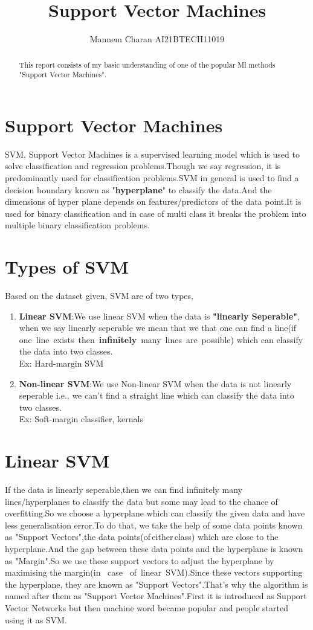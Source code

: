 \documentclass[journal,12pt,onecolumn]{IEEEtran}
\theoremstyle{remark}
\numberwithin{equation}{section}
\begin{document}
	 \title{Support Vector Machines}
	 \author{Mannem Charan AI21BTECH11019}
	 \maketitle
	   \begin{abstract}
		This report consists of my basic understanding of one of the popular Ml methods "Support Vector Machines".
	   \end{abstract}
           \section{Support Vector Machines}
	     SVM, Support Vector Machines is a supervised learning model which is used to solve classification and regression problems.Though we say regression, it is predominantly used for classification problems.SVM in general is used to find a decision boundary known as "\textbf{hyperplane}" to  classify the data.And the dimensions of hyper plane depends on features/predictors of the data point.It is used for binary classification and in case of multi class it breaks the problem into multiple binary classification problems.
	   \section{Types of SVM}
	     Based on the dataset given, SVM are of two types,
	      \begin{enumerate}
		      \item \textbf{Linear SVM}:We use linear SVM when the data is \textbf{"linearly Seperable"}, when we say linearly seperable we mean that we that one can find a line(if\, one\, line\, exists\, then\, \textbf{infinitely}\, many\, lines\, are\, possible) which can classify the data into two classes.\\
		       Ex: Hard-margin SVM
                      \item \textbf{Non-linear SVM}:We use Non-linear SVM when the data is not linearly seperable i.e., we can't find a straight line which can classify the data into two classes.\\
		       Ex: Soft-margin classifier, kernals
	      \end{enumerate}
	    \section{Linear SVM}
	      If the data is linearly seperable,then we can find infinitely many lines/hyperplanes to classify the data but some may lead to the chance of overfitting.So we choose a hyperplane which can classify the given data and have less generalisation error.To do that, we take the help of some data points known as "Support Vectors",the data points(of\,either\,class) which are close to the hyperplane.And the gap between these data points and the hyperplane is known as "Margin".So we use these support vectors to adjust the hyperplane by maximising the margin(in \, case \, of\, linear\, SVM).Since these vectors supporting the hyperplane, they are known as "Support Vectors".That's why the algorithm is named after them as "Support Vector Machines".First it is introduced as Support Vector Networks but then machine word became popular and people started using it as SVM.
\end{document}
